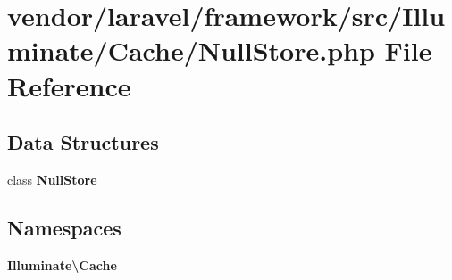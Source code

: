 \section{vendor/laravel/framework/src/\+Illuminate/\+Cache/\+Null\+Store.php File Reference}
\label{_null_store_8php}
\subsection*{Data Structures}
\begin{DoxyCompactItemize}
\item 
class {\bf Null\+Store}
\end{DoxyCompactItemize}
\subsection*{Namespaces}
\begin{DoxyCompactItemize}
\item 
 {\bf Illuminate\textbackslash{}\+Cache}
\end{DoxyCompactItemize}
